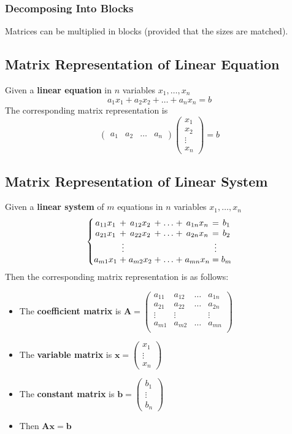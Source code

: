 \documentclass[../ma2001_notes.tex]{subfiles}
\begin{document}
\subsubsection{Decomposing Into Blocks}
Matrices can be multiplied in blocks (provided that the sizes are matched).

\subsection{Matrix Representation of Linear Equation}
Given a \textbf{linear equation} in \(n\) variables \(x_1,\ldots,x_n\)
\[a_1x_1+a_2x_2+\ldots+a_nx_n=b\]
The corresponding matrix representation is
\[\begin{pmatrix}
	a_1 & a_2 & \ldots & a_n
\end{pmatrix}\begin{pmatrix}
	x_1 \\ x_2 \\ \vdots \\ x_n
\end{pmatrix}=b\]

\subsection{Matrix Representation of Linear System}
Given a \textbf{linear system} of \(m\) equations in \(n\) variables \(x_1,\ldots,x_n\)
\[\left\{\arraycolsep=1.4pt\begin{matrix}
	a_{11}x_1 & + & a_{12}x_2 & + & \ldots & + & a_{1n}x_n & = & b_1 \\
	a_{21}x_1 & + & a_{22}x_2 & + & \ldots & + & a_{2n}x_n & = & b_2 \\
	& \vdots & & & & & & \vdots & \\
	a_{m1}x_1 & + & a_{m2}x_2 & + & \ldots & + & a_{mn}x_n & = & b_m \\
\end{matrix}\right.\]
Then the corresponding matrix representation is as follows:
\begin{itemize}
	\item The \textbf{coefficient matrix} is \(\bm{A}=\begin{pmatrix}
		a_{11} & a_{12} & \ldots & a_{1n} \\
		a_{21} & a_{22} & \ldots & a_{2n} \\
		\vdots & \vdots & & \vdots \\
		a_{m1} & a_{m2} & \ldots & a_{mn} \\
	\end{pmatrix}\)
	\item The \textbf{variable matrix} is \(\bm{x}=\begin{pmatrix}
		x_1 \\ \vdots \\ x_n
	\end{pmatrix}\)
	\item The \textbf{constant matrix} is \(\bm{b}=\begin{pmatrix}
		b_1 \\ \vdots \\ b_n
	\end{pmatrix}\)
	\item Then \(\bm{Ax}=\bm{b}\)
\end{itemize}
\end{document}
